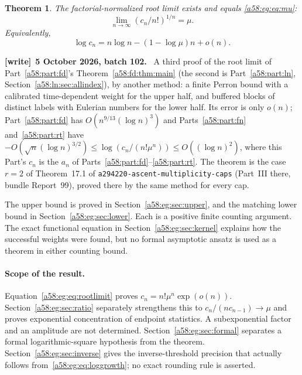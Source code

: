 \documentclass[11pt,letterpaper]{article}
\newcommand{\file}[1]{\nolinkurl{#1}}
\newtheorem{theorem}{Theorem}[section]
\theoremstyle{remark}
\newcommand{\muval}{\mu}
\newenvironment{writenote}[1][]{\par\smallskip\begingroup\small
 \noindent\textbf{[write]}\if\relax\detokenize{#1}\relax\else~\textbf{#1.}\fi\ }%
 {\par\endgroup\smallskip}
\begin{document}
\begin{theorem}\label{a58:eg:thm:main}
The factorial-normalized root limit exists and equals \eqref{a58:eg:eq:mu}:
\begin{equation}\label{a58:eg:eq:rootlimit}
 \lim_{n\to\infty}(c_n/n!)^{1/n}=\muval.
\end{equation}
Equivalently,
\begin{equation}\label{a58:eg:eq:loggrowth}
 \log c_n=n\log n-(1-\log\muval)n+o(n).
\end{equation}
\end{theorem}

\begin{writenote}[5 October 2026, batch 102]
A third proof of the root limit of Part~\ref{a58:part:fd}'s Theorem~\ref{a58:fd:thm:main} (the second is Part~\ref{a58:part:ln}, Section~\ref{a58:ln:sec:allindex}), by another method: a finite Perron bound with a calibrated time-dependent weight for the upper half, and buffered blocks of distinct labels with Eulerian numbers for the lower half. Its error is only $o(n)$; Part~\ref{a58:part:fd} has $O(n^{9/13}(\log n)^3)$ and Parts~\ref{a58:part:fn} and~\ref{a58:part:rt} have $-O(\sqrt n(\log n)^{3/2})\le\log(c_n/(n!\mu^n))\le O((\log n)^2)$, where this Part's $c_n$ is the $a_n$ of Parts~\ref{a58:part:fd}--\ref{a58:part:rt}. The theorem is the case $r=2$ of Theorem~17.1 of \file{a294220-ascent-multiplicity-caps} (Part~III there, bundle Report~99), proved there by the same method for every cap.
\end{writenote}
The upper bound is proved in Section~\ref{a58:eg:sec:upper}, and the matching lower bound in Section~\ref{a58:eg:sec:lower}. Each is a positive finite counting argument. The exact functional equation in Section~\ref{a58:eg:sec:kernel} explains how the successful weights were found, but no formal asymptotic ansatz is used as a theorem in either counting bound.

\paragraph{Scope of the result.}
Equation~\eqref{a58:eg:eq:rootlimit} proves $c_n=n!\muval^n\exp(o(n))$. Section~\ref{a58:eg:sec:ratio} separately strengthens this to $c_n/(nc_{n-1})\to\muval$ and proves exponential concentration of endpoint statistics. A subexponential factor and an amplitude are not determined. Section~\ref{a58:eg:sec:formal} separates a formal logarithmic-square hypothesis from the theorem. Section~\ref{a58:eg:sec:inverse} gives the inverse-threshold precision that actually follows from~\eqref{a58:eg:eq:loggrowth}; no exact rounding rule is asserted.
\end{document}
